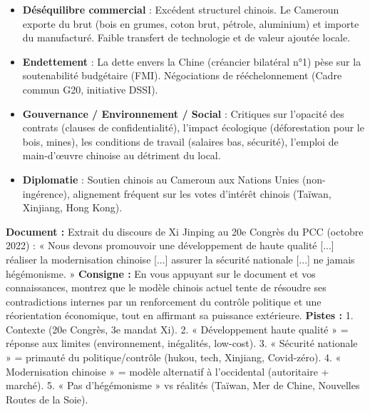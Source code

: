 \documentclass[11pt]{article}
\begin{document}
\begin{attention}
\begin{itemize}
\item \textbf{Déséquilibre commercial} : Excédent structurel chinois. Le Cameroun exporte du brut (bois en grumes, coton brut, pétrole, aluminium) et importe du manufacturé. Faible transfert de technologie et de valeur ajoutée locale.
\item \textbf{Endettement} : La dette envers la Chine (créancier bilatéral n°1) pèse sur la soutenabilité budgétaire (FMI). Négociations de rééchelonnement (Cadre commun G20, initiative DSSI).
\item \textbf{Gouvernance / Environnement / Social} : Critiques sur l'opacité des contrats (clauses de confidentialité), l'impact écologique (déforestation pour le bois, mines), les conditions de travail (salaires bas, sécurité), l'emploi de main-d'œuvre chinoise au détriment du local.
\item \textbf{Diplomatie} : Soutien chinois au Cameroun aux Nations Unies (non-ingérence), alignement fréquent sur les votes d'intérêt chinois (Taïwan, Xinjiang, Hong Kong).
\end{itemize}
\end{attention}

\begin{exercice}
\textbf{Document :} Extrait du discours de Xi Jinping au 20e Congrès du PCC (octobre 2022) : « Nous devons promouvoir une développement de haute qualité [...] réaliser la modernisation chinoise [...] assurer la sécurité nationale [...] ne jamais hégémonisme. »
\textbf{Consigne :} En vous appuyant sur le document et vos connaissances, montrez que le modèle chinois actuel tente de résoudre ses contradictions internes par un renforcement du contrôle politique et une réorientation économique, tout en affirmant sa puissance extérieure.
\textbf{Pistes :} 1. Contexte (20e Congrès, 3e mandat Xi). 2. « Développement haute qualité » = réponse aux limites (environnement, inégalités, low-cost). 3. « Sécurité nationale » = primauté du politique/contrôle (hukou, tech, Xinjiang, Covid-zéro). 4. « Modernisation chinoise » = modèle alternatif à l'occidental (autoritaire + marché). 5. « Pas d'hégémonisme » vs réalités (Taïwan, Mer de Chine, Nouvelles Routes de la Soie).
\end{exercice}
\end{document}
